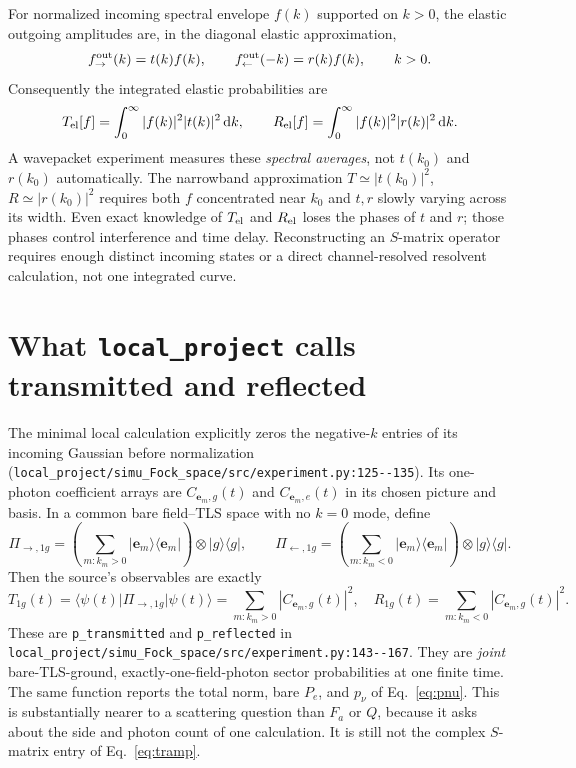 \documentclass[11pt,a4paper]{article}
\newcommand{\ket}[1]{\lvert #1\rangle}
\newcommand{\bra}[1]{\langle #1\rvert}
\newcommand{\code}[1]{\nolinkurl{#1}}
\newcommand{\dd}{\mathrm d}
\begin{document}
For normalized incoming spectral envelope $f(k)$ supported on $k>0$, the elastic outgoing amplitudes are, in the diagonal elastic approximation,
\begin{equation}
 f_{\to}^{\rm out}(k)=t(k)f(k),\qquad
 f_{\leftarrow}^{\rm out}(-k)=r(k)f(k),\qquad k>0.
 \label{eq:envelopes}
\end{equation}
Consequently the integrated elastic probabilities are
\begin{equation}
 T_{\rm el}[f]=\int_0^\infty |f(k)|^2|t(k)|^2\,\dd k,
 \qquad R_{\rm el}[f]=\int_0^\infty |f(k)|^2|r(k)|^2\,\dd k.
 \label{eq:packetprob}
\end{equation}
A wavepacket experiment measures these \emph{spectral averages}, not $t(k_0)$ and $r(k_0)$ automatically. The narrowband approximation $T\simeq|t(k_0)|^2$, $R\simeq|r(k_0)|^2$ requires both $f$ concentrated near $k_0$ and $t,r$ slowly varying across its width. Even exact knowledge of $T_{\rm el}$ and $R_{\rm el}$ loses the phases of $t$ and $r$; those phases control interference and time delay. Reconstructing an $S$-matrix operator requires enough distinct incoming states or a direct channel-resolved resolvent calculation, not one integrated curve.

\section[What the local project calls transmitted and reflected]{What \code{local_project} calls transmitted and reflected}
\label{sec:local}
The minimal local calculation explicitly zeros the negative-$k$ entries of its incoming Gaussian before normalization (\code{local_project/simu_Fock_space/src/experiment.py:125--135}). Its one-photon coefficient arrays are $C_{\mathbf e_m,g}(t)$ and $C_{\mathbf e_m,e}(t)$ in its chosen picture and basis. In a common bare field--TLS space with no $k=0$ mode, define
\begin{equation}
 \Pi_{\to,1g}=
 \left(\sum_{m:k_m>0}\ket{\mathbf e_m}\bra{\mathbf e_m}\right)
 \otimes\ket g\bra g,\qquad
 \Pi_{\leftarrow,1g}=
 \left(\sum_{m:k_m<0}\ket{\mathbf e_m}\bra{\mathbf e_m}\right)
 \otimes\ket g\bra g.
 \label{eq:projectors}
\end{equation}
Then the source's observables are exactly
\begin{equation}
 T_{1g}(t)=\bra{\psi(t)}\Pi_{\to,1g}\ket{\psi(t)}
 =\sum_{m:k_m>0}|C_{\mathbf e_m,g}(t)|^2,
 \quad
 R_{1g}(t)=\sum_{m:k_m<0}|C_{\mathbf e_m,g}(t)|^2.
 \label{eq:localTR}
\end{equation}
These are \code{p_transmitted} and \code{p_reflected} in \code{local_project/simu_Fock_space/src/experiment.py:143--167}. They are \emph{joint} bare-TLS-ground, exactly-one-field-photon sector probabilities at one finite time. The same function reports the total norm, bare $P_e$, and $p_\nu$ of Eq.~\eqref{eq:pnu}. This is substantially nearer to a scattering question than $F_a$ or $Q$, because it asks about the side and photon count of one calculation. It is still not the complex $S$-matrix entry of Eq.~\eqref{eq:tramp}.
\end{document}

